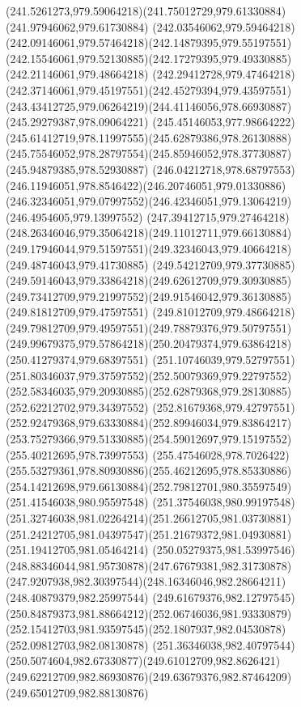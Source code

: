 {{		\curveto(241.5261273,979.59064218)(241.75012729,979.61330884)(241.97946062,979.61730884)
		\curveto(242.03546062,979.59464218)(242.09146061,979.57464218)(242.14879395,979.55197551)
		\curveto(242.15546061,979.52130885)(242.17279395,979.49330885)(242.21146061,979.48664218)
		\curveto(242.29412728,979.47464218)(242.37146061,979.45197551)(242.45279394,979.43597551)
		\curveto(243.43412725,979.06264219)(244.41146056,978.66930887)(245.29279387,978.09064221)
		\curveto(245.45146053,977.98664222)(245.61412719,978.11997555)(245.62879386,978.26130888)
		\curveto(245.75546052,978.28797554)(245.85946052,978.37730887)(245.94879385,978.52930887)
		\curveto(246.04212718,978.68797553)(246.11946051,978.8546422)(246.20746051,979.01330886)
		\curveto(246.32346051,979.07997552)(246.42346051,979.13064219)(246.4954605,979.13997552)
		\curveto(247.39412715,979.27464218)(248.26346046,979.35064218)(249.11012711,979.66130884)
		\curveto(249.17946044,979.51597551)(249.32346043,979.40664218)(249.48746043,979.41730885)
		\curveto(249.54212709,979.37730885)(249.59146043,979.33864218)(249.62612709,979.30930885)
		\curveto(249.73412709,979.21997552)(249.91546042,979.36130885)(249.81812709,979.47597551)
		\curveto(249.81012709,979.48664218)(249.79812709,979.49597551)(249.78879376,979.50797551)
		\curveto(249.99679375,979.57864218)(250.20479374,979.63864218)(250.41279374,979.68397551)
		\curveto(251.10746039,979.52797551)(251.80346037,979.37597552)(252.50079369,979.22797552)
		\curveto(252.58346035,979.20930885)(252.62879368,979.28130885)(252.62212702,979.34397552)
		\curveto(252.81679368,979.42797551)(252.92479368,979.63330884)(252.89946034,979.83864217)
		\curveto(253.75279366,979.51330885)(254.59012697,979.15197552)(255.40212695,978.73997553)
		\curveto(255.47546028,978.7026422)(255.53279361,978.80930886)(255.46212695,978.85330886)
		\curveto(254.14212698,979.66130884)(252.79812701,980.35597549)(251.41546038,980.95597548)
		\curveto(251.37546038,980.99197548)(251.32746038,981.02264214)(251.26612705,981.03730881)
		\curveto(251.24212705,981.04397547)(251.21679372,981.04930881)(251.19412705,981.05464214)
		\curveto(250.05279375,981.53997546)(248.88346044,981.95730878)(247.67679381,982.31730878)
		\curveto(247.9207938,982.30397544)(248.16346046,982.28664211)(248.40879379,982.25997544)
		\curveto(249.61679376,982.12797545)(250.84879373,981.88664212)(252.06746036,981.93330879)
		\curveto(252.15412703,981.93597545)(252.1807937,982.04530878)(252.09812703,982.08130878)
		\curveto(251.36346038,982.40797544)(250.5074604,982.67330877)(249.61012709,982.8626421)
		\curveto(249.62212709,982.86930876)(249.63679376,982.87464209)(249.65012709,982.88130876)
}}
